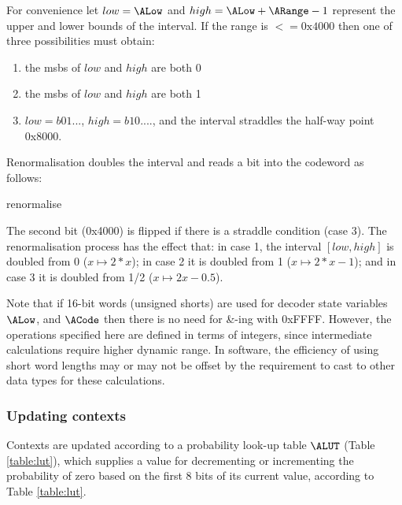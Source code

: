 For convenience let $low=\ALow$ and $high=\ALow+\ARange-1$ 
represent the upper and lower bounds of the interval. If the
range is $<=\text{0x4000}$ then
one of three possibilities must obtain:
\begin{enumerate}
\item the msbs of $low$ and $high$ are both 0
\item the msbs of $low$ and $high$ are both 1
\item $low=b01...$, $high=b10....$,  and the interval straddles the half-way point 0x8000. 
\end{enumerate}

Renormalisation doubles the interval and reads a bit into the codeword
as follows:

\begin{pseudo}{renormalise}{}
\bsEND
{}
\end{pseudo}

The second bit (0x4000) is flipped if there is a straddle condition (case 3). The renormalisation
process has the effect that: in case 1, the interval $[low,high]$ is doubled from 0 ($x\mapsto 2*x$); 
in case 2 it is doubled from 1 ($x\mapsto 2*x-1$); and in case 3 it is doubled from 1/2 ($x\mapsto 2x-0.5$).
 
\begin{informative}
Note that if 16-bit words (unsigned shorts) are used for decoder state variables $\ALow$,
 and $\ACode$ then there is no need for {\&}-ing with 0xFFFF. However, the 
operations specified here are defined in terms of integers, since intermediate calculations
 require higher dynamic range. In software, the efficiency of using short word lengths may
or may not be offset by the requirement to cast to other data types for these calculations.
\end{informative}

\subsubsection{Updating contexts}
\label{contextupdate}

Contexts are updated according to a probability look-up table
$\ALUT$ (Table \ref{table:lut}), which supplies a value for decrementing
or incrementing the probability of zero based on the first 
8 bits of its current value, according to Table \ref{table:lut}.

